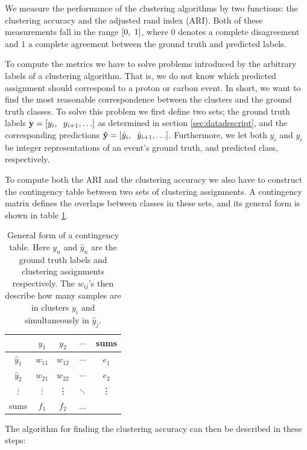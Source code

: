 \documentclass[review,sort&compress]{elsarticle}
\begin{document}
We measure the performance of the clustering algorithms by two functions: the clustering accuracy and the adjusted rand index (ARI)\cite{Hubert1985}. Both of these measurements fall in the range $ [0, \hspace{0.1cm}1]$, where $0$ denotes a complete disagreement and $1$ a complete agreement between the ground truth and predicted labels.

To compute the metrics we have to solve problems introduced by the arbitrary labels of a clustering algorithm. That is, we do not know which predicted assignment should correspond to a proton or carbon event. In short, we want to find the most reasonable correspondence between the clusters and the ground truth classes. To solve this problem we first define two sets; the ground truth labels $\mathbf{y} = [y_i, \hspace{0.2cm} y_{i +1}, \ldots]$ as determined in section \ref{sec:datadescript}, and the corresponding predictions $\mathbf{\hat{y}} = [\hat{y}_i, \hspace{0.2cm} \hat{y}_{i +1}, \ldots]$. Furthermore, we let both $y_i$ and $\hat{y}_i$ be integer representations of an event's ground truth, and predicted class, respectively. 

To compute both the ARI and the clustering accuracy we also have to construct the contingency table between two sets of clustering assignments. A contingency matrix defines the overlaps between classes in these sets, and its general form is shown in table \ref{tab:contingency}.

\begin{table}[H]
\centering
\caption{General form of a contingency table. Here $y_n$ and $\hat{y}_n$ are the ground truth labels and clustering assignments respectively. The $w_{ij}$'s then describe how many samples are in clusters $y_i$ and simultaneously in $\hat{y}_j$.}\label{tab:contingency}
\begin{tabular}{c|ccc|c}
& $y_1$ &$y_2$ & $\cdots$ & sums \\
\midrule
$\hat{y}_1$ & $w_{11}$ & $w_{12}$ &  $\cdots$ & $e_1$ \\
$\hat{y}_2$ & $w_{21}$ & $w_{22}$ &  $\cdots$ & $e_2$\\
$\vdots$ & $\vdots$ & \vdots & $\ddots$ & \vdots \\
\hline
sums & $f_1$ & $f_2$ & $\hdots$ 
\end{tabular}
\end{table}

The algorithm for finding the clustering accuracy can then be described in these steps: 
\end{document}
